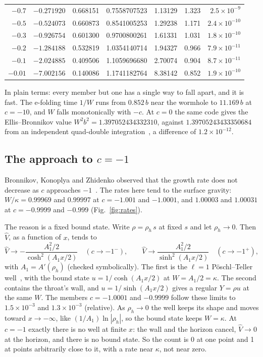 \documentclass[11pt]{article}
\theoremstyle{plain}
\begin{document}
\begin{table}[t]
\begin{tabular}{rrrlrrr}
$-0.7$ & $-0.271920$ & 0.668151 & 0.7558707523 & 1.13129 & 1.323 & $2.5\times10^{-9}$ \\
$-0.5$ & $-0.524073$ & 0.660873 & 0.8541005253 & 1.29238 & 1.171 & $2.4\times10^{-10}$ \\
$-0.3$ & $-0.926754$ & 0.601300 & 0.9700800261 & 1.61331 & 1.031 & $1.8\times10^{-10}$ \\
$-0.2$ & $-1.284188$ & 0.532819 & 1.0354140714 & 1.94327 & 0.966 & $7.9\times10^{-11}$ \\
$-0.1$ & $-2.024885$ & 0.409506 & 1.1059696680 & 2.70074 & 0.904 & $8.7\times10^{-11}$ \\
$-0.01$ & $-7.002156$ & 0.140086 & 1.1741182764 & 8.38142 & 0.852 & $1.9\times10^{-10}$ \\
\bottomrule
\end{tabular}
\end{table}

In plain terms: every member but one has a single way to fall apart, and it is fast. The e-folding time $1/W$ runs from
$0.852\,b$ near the wormhole to $11.169\,b$ at $c=-10$, and $W$ falls monotonically with $-c$. At $c=0$ the same code gives
the Ellis--Bronnikov value $W^2b^2=1.397052434332310$, against $1.39705243433350684$ from an independent quad-double
integration~\cite{Moinvaziri2026c}, a difference of $1.2\times10^{-12}$.

\subsection{The approach to \texorpdfstring{$c=-1$}{c = -1}}\label{sec:limit}

Bronnikov, Konoplya and Zhidenko observed that the growth rate does not decrease as $c$ approaches $-1$~\cite{BKZ12}. The
rates here tend to the surface gravity: $W/\kappa=0.99969$ and $0.99997$ at $c=-1.001$ and $-1.0001$, and $1.00003$ and
$1.00031$ at $c=-0.9999$ and $-0.999$ (Fig.~\ref{fig:rates}).

The reason is a fixed bound state. Write $\rho=\rho_h\,s$ at fixed $s$ and let $\rho_h\to0$. Then $\hat V$, as a function of
$x$, tends to
\begin{equation}
\hat V\to-\frac{A_1^2/2}{\cosh^2(A_1x/2)}\quad(c\to-1^-),\qquad
\hat V\to\frac{A_1^2/2}{\sinh^2(A_1x/2)}\quad(c\to-1^+),
\end{equation}
with $A_1=A'(\rho_h)$ (checked symbolically). The first is the $\ell=1$ Pöschl--Teller well~\cite{PT1933}, with the bound
state $u=1/\cosh(A_1x/2)$ at $W=A_1/2=\kappa$. The second contains the throat's wall, and $u=1/\sinh(A_1x/2)$ gives a regular
$Y=\rho u$ at the same $W$. The members $c=-1.0001$ and $-0.9999$ follow these limits to $1.5\times10^{-3}$ and
$1.3\times10^{-3}$ (relative). As $\rho_h\to0$ the well keeps its shape and moves toward $x\to-\infty$, like
$(1/A_1)\ln|\rho_h|$, so the bound state keeps $W=\kappa$. At $c=-1$ exactly there is no well at finite $x$: the wall and the
horizon cancel, $\hat V\to0$ at the horizon, and there is no bound state. So the count is 0 at one point and 1 at points
arbitrarily close to it, with a rate near $\kappa$, not near zero.
\end{document}

